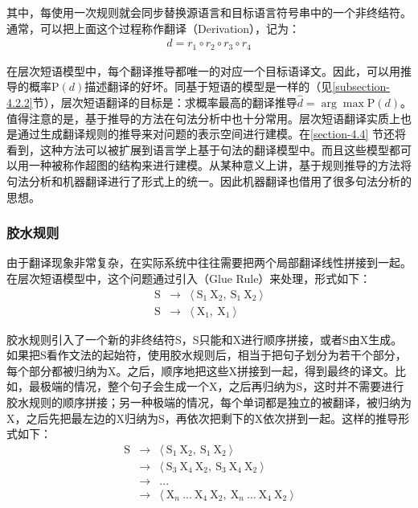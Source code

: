 \noindent 其中，每使用一次规则就会同步替换源语言和目标语言符号串中的一个非终结符。通常，可以把上面这个过程称作翻译{\small{}}（Derivation），记为：
\begin{eqnarray}
d = {r_1} \circ {r_2} \circ {r_3} \circ {r_4}
\label{eq:4-22}
\end{eqnarray}

\parinterval 在层次短语模型中，每个翻译推导都唯一的对应一个目标语译文。因此，可以用推导的概率$\textrm{P}(d)$描述翻译的好坏。同基于短语的模型是一样的（见\ref{subsection-4.2.2}节），层次短语翻译的目标是：求概率最高的翻译推导$\hat{d}=\arg\max\textrm{P}(d)$。值得注意的是，基于推导的方法在句法分析中也十分常用。层次短语翻译实质上也是通过生成翻译规则的推导来对问题的表示空间进行建模。在\ref{section-4.4} 节还将看到，这种方法可以被扩展到语言学上基于句法的翻译模型中。而且这些模型都可以用一种被称作超图的结构来进行建模。从某种意义上讲，基于规则推导的方法将句法分析和机器翻译进行了形式上的统一。因此机器翻译也借用了很多句法分析的思想。


\subsubsection{胶水规则}

\parinterval 由于翻译现象非常复杂，在实际系统中往往需要把两个局部翻译线性拼接到一起。在层次短语模型中，这个问题通过引入{\small{}}（Glue Rule）来处理，形式如下：
\begin{eqnarray}
\textrm{S} & \to & \langle\ \textrm{S}_1\ \textrm{X}_2,\ \textrm{S}_1\ \textrm{X}_2\ \rangle \nonumber \\
\textrm{S} & \to & \langle\ \textrm{X}_1,\ \textrm{X}_1\ \rangle \nonumber
\end{eqnarray}

\parinterval 胶水规则引入了一个新的非终结符S，S只能和X进行顺序拼接，或者S由X生成。如果把S看作文法的起始符，使用胶水规则后，相当于把句子划分为若干个部分，每个部分都被归纳为X。之后，顺序地把这些X拼接到一起，得到最终的译文。比如，最极端的情况，整个句子会生成一个X，之后再归纳为S，这时并不需要进行胶水规则的顺序拼接；另一种极端的情况，每个单词都是独立的被翻译，被归纳为X，之后先把最左边的X归纳为S，再依次把剩下的X依次拼到一起。这样的推导形式如下：
\begin{eqnarray}
\textrm{S} & \to & \langle\ \textrm{S}_1\ \textrm{X}_2,\ \textrm{S}_1\ \textrm{X}_2\ \rangle \nonumber \\
                & \to & \langle\ \textrm{S}_3\ \textrm{X}_4\ \textrm{X}_2,\ \textrm{S}_3\ \textrm{X}_4\ \textrm{X}_2\ \rangle \nonumber \\
                & \to & ... \nonumber \\
                & \to & \langle\ \textrm{X}_n\ ...\ \textrm{X}_4\ \textrm{X}_2,\ \textrm{X}_n\ ...\ \textrm{X}_4\ \textrm{X}_2\ \rangle \nonumber
\end{eqnarray}

